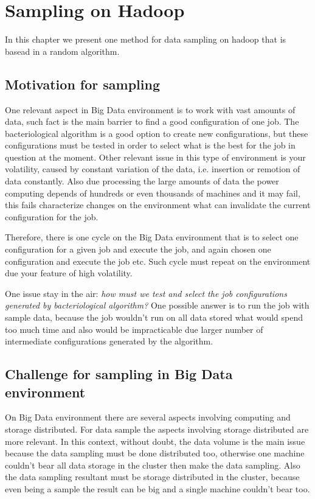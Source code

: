 \chapter{Sampling on Hadoop} %
\label{cha:sample}

In this chapter we present one method for data sampling on hadoop that is basead
in a random algorithm.

\section{Motivation for sampling}

One relevant aspect in Big Data environment is to work with vast amounts of data,
such fact is the main barrier to find a good configuration of one job. The bacteriological
algorithm is a good option to create new configurations, but these configurations
must be tested in order to select what is the best for the job in question at the
moment. Other relevant issue in this type of environment is your volatility, caused
by constant variation of the data, i.e. insertion or remotion of data constantly.
Also due processing the large amounts of data the power computing depends of hundreds
or even thousands of machines and it may fail, this fails characterize changes on
the environment what can invalidate the current configuration for the job.

Therefore, there is one cycle on the Big Data environment that is to select one
configuration for a given job and execute the job, and again chosen one configuration
and execute the job etc. Such cycle must repeat on the environment due your feature
of high volatility.

One issue stay in the air: {\it how must we test and select the job configurations
generated by bacteriological algorithm?} One possible answer is to run the job with
sample data, because the job wouldn't run on all data stored what would spend too
much time and also would be impracticable due larger number of intermediate
configurations generated by the algorithm.

\section{Challenge for sampling in Big Data environment}

On Big Data environment there are several aspects involving computing and storage
distributed. For data sample the aspects involving storage distributed are more
relevant. In this context, without doubt, the data volume is the main issue because
the data sampling must be done distributed too, otherwise one machine couldn't bear
all data storage in the cluster then make the data sampling. Also the data sampling
resultant must be storage distributed in the cluster, because even being a sample
the result can be big and a single machine couldn't bear too.

